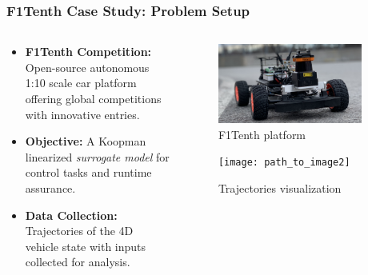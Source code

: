 \documentclass[shortpres,aspectratio=43]{beamer}
\begin{document}
\begin{frame}
\frametitle{F1Tenth Case Study: Problem Setup}
\begin{columns}
	\begin{column}{0.5\textwidth}
	\begin{itemize}
	    \item<1-> \textbf{F1Tenth Competition:} Open-source autonomous 1:10 scale car platform offering global competitions with innovative entries.
	    \item<3-> \textbf{Objective:} A Koopman linearized \textit{surrogate model} for control tasks and runtime assurance.
	    \item<4-> \textbf{Data Collection:} Trajectories of the 4D vehicle state with inputs collected for analysis.
	\end{itemize}
	\end{column}
	\begin{column}{0.5\textwidth}
\begin{figure}
  \centering
  \includegraphics[width=0.9\textwidth]{./img/f1tenth.png}
  \caption{F1Tenth platform}
\end{figure}

\begin{figure}
  \centering
  \texttt{[image: path\_to\_image2]} %
  \caption{Trajectories visualization}
\end{figure}
	\end{column}

\end{columns}
\end{frame}
\end{document}

